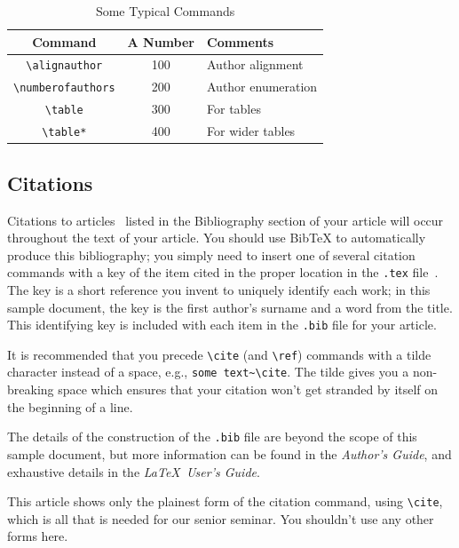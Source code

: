 \documentclass[sigplan,screen,nonacm]{acmart}
\begin{document}
\begin{table}[t]
\centering
\caption{Some Typical Commands}
\label{tab:typicalCommands}
\begin{tabular}{ccl}
Command & A Number & Comments \\ \hline
\texttt{\textbackslash alignauthor}     & 100 & Author alignment\\
\texttt{\textbackslash numberofauthors} & 200 & Author enumeration\\
\texttt{\textbackslash table}           & 300 & For tables\\
\texttt{\textbackslash table*}          & 400 & For wider tables\\ 
\end{tabular}
\end{table}

\subsection{Citations}
\label{sec:citations}

Citations to articles~\cite{Aaronson:2005,Garey:1979,Brun:2008} listed
in the Bibliography section of your
article will occur throughout the text of your article.
You should use BibTeX to automatically produce this bibliography;
you simply need to insert one of several citation commands with
a key of the item cited in the proper location in
the \texttt{.tex} file~\cite{OM:2008}.
The key is a short reference you invent to uniquely
identify each work; in this sample document, the key is
the first author's surname and a
word from the title.  This identifying key is included
with each item in the \texttt{.bib} file for your article.

It is recommended that you precede \texttt{\textbackslash cite} (and 
\texttt{\textbackslash ref}) commands with a tilde
character instead of a space, e.g., \texttt{some text\textasciitilde\textbackslash cite}. The tilde gives you a non-breaking space which ensures that your citation won't get
stranded by itself on the beginning of a line.

The details of the construction of the \texttt{.bib} file
are beyond the scope of this sample document, but more
information can be found in the \textit{Author's Guide},
and exhaustive details in the \textit{\LaTeX\ User's
Guide}.

This article shows only the plainest form
of the citation command, using \texttt{\textbackslash cite},
which is all that is needed for our senior seminar.
You shouldn't use any other forms here.
\end{document}
